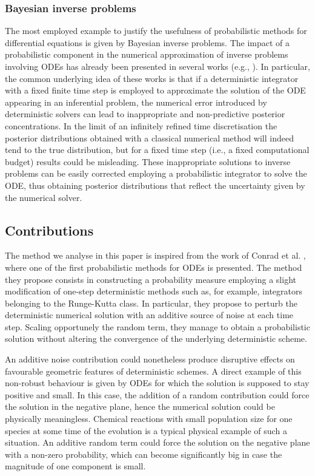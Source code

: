 \documentclass[final,onefignum,onetabnum]{siamonline171218}
\begin{document}
\subsubsection*{Bayesian inverse problems} The most employed example to justify the usefulness of probabilistic methods for differential equations is given by Bayesian inverse problems. The impact of a probabilistic component in the numerical approximation of inverse problems involving ODEs has already been presented in several works (e.g., \cite{CGS16, CCC16, COS17}). In particular, the common underlying idea of these works is that if a deterministic integrator with a fixed finite time step is employed to approximate the solution of the ODE appearing in an inferential problem, the numerical error introduced by deterministic solvers can lead to inappropriate and non-predictive posterior concentrations. In the limit of an infinitely refined time discretisation the posterior distributions obtained with a classical numerical method will indeed tend to the true distribution, but for a fixed time step (i.e., a fixed computational budget) results could be misleading. These inappropriate solutions to inverse problems can be easily corrected employing a probabilistic integrator to solve the ODE, thus obtaining posterior distributions that reflect the uncertainty given by the numerical solver.

\subsection{Contributions} The method we analyse in this paper is inspired from the work of Conrad et al. \cite{CGS16}, where one of the first probabilistic methods for ODEs is presented. The method they propose consists in constructing a probability measure employing a slight modification of one-step deterministic methods such as, for example, integrators belonging to the Runge-Kutta class. In particular, they propose to perturb the deterministic numerical solution with an additive source of noise at each time step. Scaling opportunely the random term, they manage to obtain a probabilistic solution without altering the convergence of the underlying deterministic scheme. 

An additive noise contribution could nonetheless produce disruptive effects on favourable geometric features of deterministic schemes. A direct example of this non-robust behaviour is given by ODEs for which the solution is supposed to stay positive and small. In this case, the addition of a random contribution could force the solution in the negative plane, hence the numerical solution could be physically meaningless. Chemical reactions with small population size for one species at some time of the evolution is a typical physical example of such a situation. An additive random term could force the solution on the negative plane with a non-zero probability, which can become significantly big in case the magnitude of one component is small.
\end{document}
